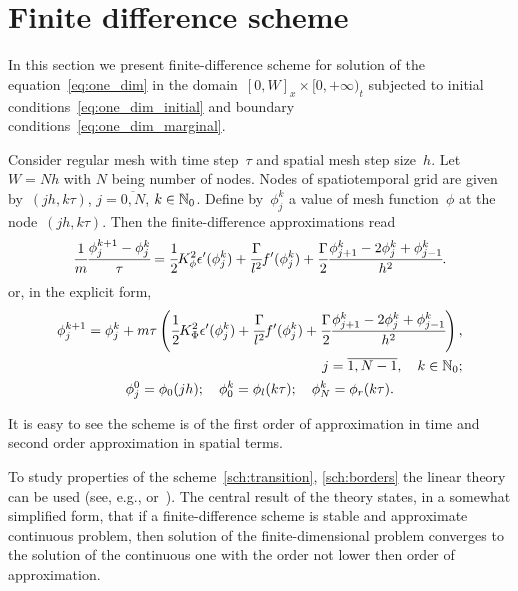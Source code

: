 
\section{Finite difference scheme}

In this section we present finite-difference scheme for solution of
the equation~\eqref{eq:one_dim} in the domain~$[0, W]_x \times [0,
+\infty)_t$
subjected to initial conditions~\eqref{eq:one_dim_initial} and boundary conditions~\eqref{eq:one_dim_marginal}.

Consider regular mesh with time step~$\tau$ and
spatial mesh step size~$h$. Let~$W = Nh$ with $N$ being number of
nodes. Nodes of spatiotemporal grid are given by~$(jh, k \tau)$,
$j = \overline{0, N}$, $k \in {\mathbb{N}}_0$. Define by~$\phi_j^k$
a value of mesh function~$\phi$ at the node~$(jh, k \tau)$.
Then the finite-difference approximations read
\begin{equation}
  \cfrac{1}{m} \cfrac{{\phi}_j^{k + 1} - {\phi}_j^k}{\tau} = \cfrac{1}{2} K_\phi^2 \epsilon'(\phi_j^k) + \cfrac{\Gamma}{l^2} f'(\phi_j^k) + \cfrac{\Gamma}{2} \cfrac{{\phi}_{j + 1}^k - 2 {\phi}_j^k + {\phi}_{j - 1}^k}{h^2} {\text{.}}
  \label{eq:subtractive}
\end{equation}
or, in the explicit form,
\begin{gather}
  \begin{aligned}
    \phi_j^{k + 1} = \phi_j^k + m \tau \left( \cfrac{1}{2} K_\Phi^2 \epsilon'(\phi_j^k) + \cfrac{\Gamma}{l^2} f'(\phi_j^k) + \cfrac{\Gamma}{2} \cfrac{{\phi}_{j + 1}^k - 2 {\phi}_j^k + {\phi}_{j - 1}^k}{h^2} \right), \\ j = \overline{1, N - 1}, \quad k \in {\mathbb{N}}_0 {\text{;}}
  \end{aligned}
  \label{sch:transition} \\
  \phi_j^0 = \phi_0(jh); \quad \phi_0^k = \phi_l(k \tau); \quad \phi_N^k = \phi_r(k \tau) {\text{.}}
  \label{sch:borders}
\end{gather}

It is easy to see the scheme is of the first order of approximation in
time and second order approximation in spatial terms.

To study properties of the scheme~\eqref{sch:transition}, \eqref{sch:borders}
the linear theory can be used (see, e.g.,
\cite[Chapter~10]{bahvalov_computational_methods}
or~\cite[Chapter~IX]{kalitkin_computational_methods}).
The central result of the theory states, in a somewhat simplified
form, that if a finite-difference scheme is stable and approximate
continuous problem, then solution of the finite-dimensional problem
converges to the solution of the continuous one with the order
not lower then order of approximation.

